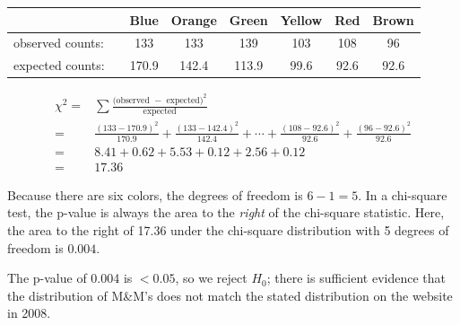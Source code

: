 \begin{examplewrap}
\begin{nexample}
\begin{description}
\begin{center}
\begin{small}
\begin{tabular}{ll ccc ccc}
\hline
	 & \hspace{1mm} & Blue & Orange & Green & Yellow & Red & Brown\\
\hline
observed counts:&		& 133 & 133 & 139 & 103 & 108 & 96  \\
expected counts:&		& 170.9 &  142.4 & 113.9 & 99.6 & 92.6 & 92.6\\
\hline
\end{tabular}
\end{small}
\end{center}
\begin{small}
\begin{align*}
\chi^2
  =& \sum{\frac{\text{(observed } - \text{ expected})^2}
      {\text{expected}}}\\
  =& \frac{(133 - 170.9)^2}{170.9}
      + \frac{(133 - 142.4)^2}{142.4}
      + \cdots
      + \frac{(108 - 92.6)^2}{92.6}
      + \frac{(96 - 92.6)^2}{92.6}\\
=&8.41+0.62+5.53+0.12+2.56+0.12\\
=&17.36
\end{align*}
\end{small}

Because there are six colors, the degrees of freedom is $6-1=5$. In a chi-square test, the p-value is always the area to the \emph{right} of the chi-square statistic.  Here, the area to the right of 17.36 under the chi-square distribution with 5 degrees of freedom is $0.004$.  
\item[\inferencestep{Conclude}]  The p-value of 0.004 is $< 0.05$, so we reject $H_0$; there is sufficient evidence that the distribution of M\&M's does not match the stated distribution on the website in 2008.  
\end{description}
\end{nexample}
\end{examplewrap}



